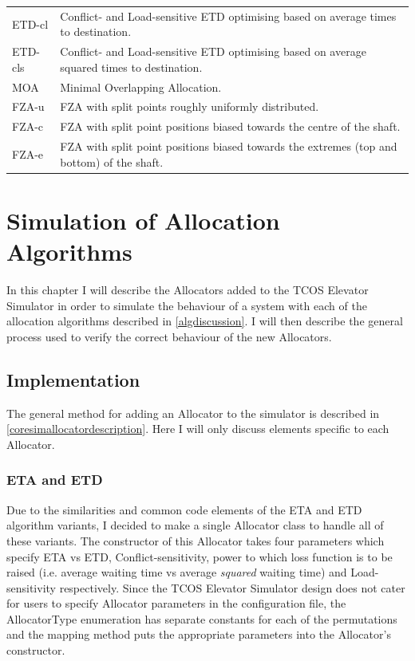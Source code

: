 \documentclass{UoYCSproject}
\begin{document}
\begin{tabularx}{\linewidth}{l X}
	ETD-cl		& Conflict- and Load-sensitive ETD optimising based on average times to destination. \\
	ETD-cls		& Conflict- and Load-sensitive ETD optimising based on average squared times to destination. \\
	MOA			& Minimal Overlapping Allocation. \\
	FZA-u		& FZA with split points roughly uniformly distributed. \\
	FZA-c		& FZA with split point positions biased towards the centre of the shaft. \\
	FZA-e		& FZA with split point positions biased towards the extremes (top and bottom) of the shaft.
\end{tabularx}

\chapter{Simulation of Allocation Algorithms}
\label{algsimulation}

In this chapter I will describe the Allocators added to the TCOS Elevator Simulator in order to simulate the behaviour of a system with each of the allocation algorithms described in \autoref{algdiscussion}.  I will then describe the general process used to verify the correct behaviour of the new Allocators.

\section{Implementation}

The general method for adding an Allocator to the simulator is described in \autoref{coresimallocatordescription}.  Here I will only discuss elements specific to each Allocator.

\subsection{ETA and ETD}

Due to the similarities and common code elements of the ETA and ETD algorithm variants, I decided to make a single Allocator class to handle all of these variants.  The constructor of this Allocator takes four parameters which specify ETA vs ETD, Conflict-sensitivity, power to which loss function is to be raised (i.e. average waiting time vs average \textit{squared} waiting time) and Load-sensitivity respectively.  Since the TCOS Elevator Simulator design does not cater for users to specify Allocator parameters in the configuration file, the AllocatorType enumeration has separate constants for each of the permutations and the mapping method puts the appropriate parameters into the Allocator's constructor.
\end{document}
